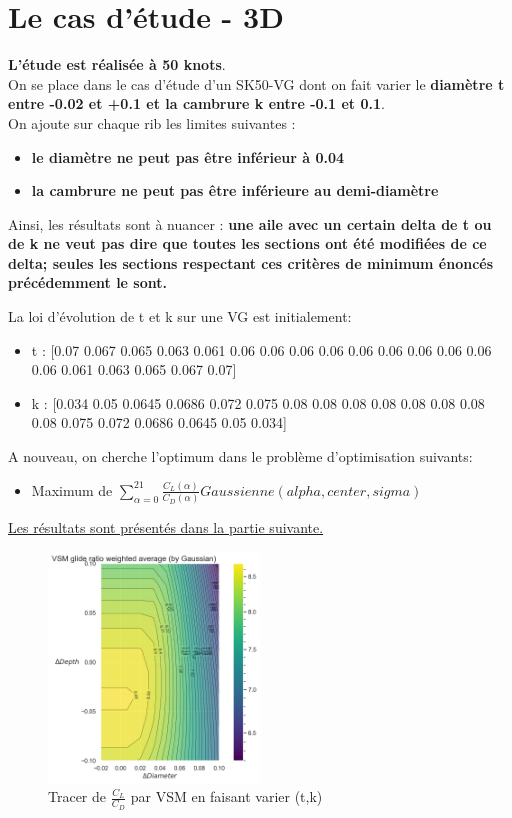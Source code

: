 
\section{Le cas d'étude - 3D} 
\label{sec:Ch2.2}

\textbf{L'étude est réalisée à 50 knots}.\\
On se place dans le cas d'étude d'un SK50-VG dont on fait varier le \textbf{diamètre t entre -0.02 et +0.1 et la cambrure k entre -0.1 et 0.1}. \\
    
    On ajoute sur chaque rib les limites suivantes :
    \begin{itemize}
        \item \textbf{le diamètre ne peut pas être inférieur à 0.04}
        \item \textbf{la cambrure ne peut pas être inférieure au demi-diamètre}
    \end{itemize}

    Ainsi, les résultats sont à nuancer : \textbf{une aile avec un certain delta de t ou de k ne veut pas dire que toutes les sections ont été modifiées de ce delta; seules les sections respectant ces critères de minimum énoncés précédemment le sont.}

La loi d'évolution de t et k sur une VG est initialement:  
\begin{itemize}
    \item t : [0.07 0.067 0.065 0.063 0.061 0.06 0.06  0.06 0.06 0.06  0.06  0.06 0.06 0.06  0.06 0.061 0.063 0.065 0.067 0.07]
    \item k : [0.034 0.05 0.0645 0.0686 0.072 0.075 0.08 0.08 0.08 0.08      0.08 0.08 0.08 0.08 0.075 0.072 0.0686 0.0645 0.05 0.034]
\end{itemize}

    A nouveau, on cherche l'optimum dans le problème d'optimisation suivants:
    \begin{itemize}
        \item Maximum de $\sum_{\alpha = 0}^{21}\frac{C_L(\alpha)}{C_D(\alpha)} Gaussienne(alpha, center, sigma) $
    \end{itemize}
    \underline{Les résultats sont présentés dans la partie suivante.}

\begin{figure}[H]
    \centering
    \includegraphics[width=0.5\textwidth]{Pics/02 - Le code/vsm.png}  
    \caption{Tracer de $\frac{C_L}{C_D}$ par VSM en faisant varier (t,k)}
    \label{fig:vsm}
    \vspace{-1cm} %
\end{figure}